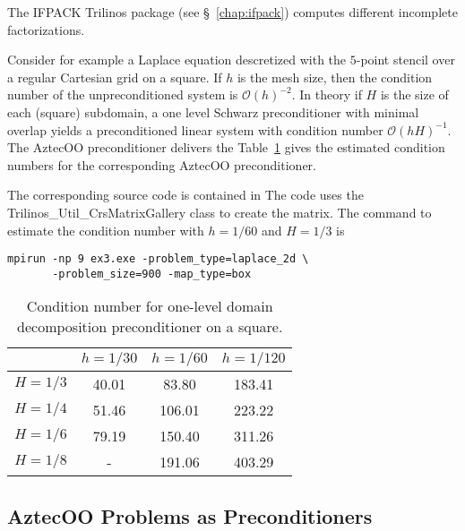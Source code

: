 \begin{remark} The IFPACK Trilinos package (see \S~\ref{chap:ifpack})
computes different incomplete factorizations. 
\end{remark}

Consider for example a Laplace equation descretized with the $5$-point stencil 
over a regular Cartesian grid on a square.
If $h$ is the mesh size, then the condition number of the unpreconditioned system
is $\mathcal{O}(h)^{-2}$.
In theory \cite{smbg:96} if $H$ is the size of each (square) subdomain,
a one level Schwarz preconditioner with minimal overlap
yields a preconditioned linear system with condition number
$\mathcal{O}(hH)^{-1}$.
The AztecOO preconditioner delivers the 
Table~\ref{tab:aztecoo:dd} gives the estimated condition
numbers for the corresponding AztecOO preconditioner.

The corresponding source code is contained in
\newline
{} 
\newline
The code uses the Trilinos\_Util\_CrsMatrixGallery class to
create the matrix. The command to estimate the condition number with
$h=1/60$ and $H=1/3$ is 
\begin{verbatim}
mpirun -np 9 ex3.exe -problem_type=laplace_2d \
       -problem_size=900 -map_type=box
\end{verbatim}

\begin{table}[htbp]
  \centering
  \begin{tabular}{| c | c c c |}
    \hline
    & $h=1/30$ & $h=1/60$ & $h=1/120$ \\
    \hline
    $H=1/3$ & 40.01 & 83.80 & 183.41 \\
    $H=1/4$ & 51.46 & 106.01 & 223.22 \\
    $H=1/6$ & 79.19 & 150.40 & 311.26 \\
    $H=1/8$ & -     & 191.06 & 403.29 \\
    \hline
  \end{tabular}
  \caption{Condition number for one-level domain decomposition preconditioner on a square.}
  \label{tab:aztecoo:dd}
\end{table}


\subsection{AztecOO Problems as Preconditioners}
\label{sec:prec_aztecoo}

